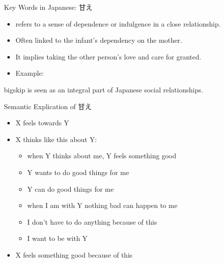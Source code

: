 \documentclass{beamer}
\begin{document}
\begin{frame}{Key Words in Japanese: 甘え }
    \begin{itemize}
        \item {} refers to a sense of dependence or indulgence in a close relationship.
        \item Often linked to the infant's dependency on the mother.
        \item It implies taking the other person's love and care for granted.
        \item Example: 
      \end{itemize}
      bigskip
        is seen as an integral part of Japanese social relationships.
\end{frame}

\begin{frame}{Semantic Explication of 甘え }
  \begin{itemize}
  \item X feels  towards Y
  \item X thinks like this about Y:
    \begin{itemize} 
    \item when Y thinks about me, Y feels something good
    \item Y wants to do good things for me
    \item Y can do good things for me
    \item when I am with Y nothing bad can happen to me
    \item I don’t have to do anything because of this
    \item I want to be with Y
    \end{itemize}
  \item X feels something good because of this
  \end{itemize}
\end{frame}
\end{document}
